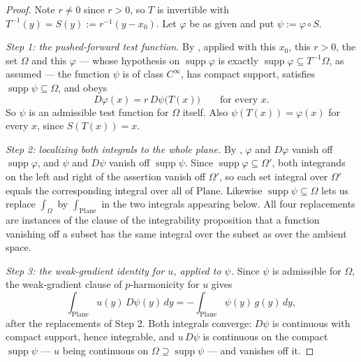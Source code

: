 \begin{proof}
Note $r\ne0$ since $r>0$, so $T$ is invertible with $T^{-1}(y)=S(y):=r^{-1}(y-x_0)$.  Let
$\varphi$ be as given and put $\psi:=\varphi\circ S$.

\medskip\noindent\emph{Step 1: the pushed-forward test function.}
By , applied with this $x_0$, this $r>0$, the set $\Omega$ and
this $\varphi$ --- whose hypothesis on $\operatorname{supp}\varphi$ is exactly
$\operatorname{supp}\varphi\subseteq T^{-1}\Omega$, as assumed --- the function $\psi$ is of class
$C^{\infty}$, has compact support, satisfies $\operatorname{supp}\psi\subseteq\Omega$, and obeys
\begin{equation}\label{eq:nwg-chain}
  D\varphi(x)=r\,D\psi\bigl(T(x)\bigr)\qquad\text{for every }x .
\end{equation}
So $\psi$ is an admissible test function for $\Omega$ itself.  Also $\psi(T(x))=\varphi(x)$ for
every $x$, since $S(T(x))=x$.

\medskip\noindent\emph{Step 2: localizing both integrals to the whole plane.}
By , $\varphi$ and $D\varphi$ vanish off
$\operatorname{supp}\varphi$, and $\psi$ and $D\psi$ vanish off $\operatorname{supp}\psi$.  Since
$\operatorname{supp}\varphi\subseteq\Omega'$, both integrands on the left and right of the
assertion vanish off $\Omega'$, so each set integral over $\Omega'$ equals the corresponding
integral over all of $\mathrm{Plane}$.  Likewise $\operatorname{supp}\psi\subseteq\Omega$ lets us
replace $\int_\Omega$ by $\int_{\mathrm{Plane}}$ in the two integrals appearing below.  All four
replacements are instances of the clause of the integrability proposition that a function
vanishing off a subset has the same integral over the subset as over the ambient space.

\medskip\noindent\emph{Step 3: the weak-gradient identity for $u$, applied to $\psi$.}
Since $\psi$ is admissible for $\Omega$, the weak-gradient clause of
$p$-harmonicity for $u$ gives
\begin{equation}\label{eq:nwg-key}
  \int_{\mathrm{Plane}}u(y)\,D\psi(y)\,dy=-\int_{\mathrm{Plane}}\psi(y)\,g(y)\,dy ,
\end{equation}
after the replacements of Step 2.  Both integrals converge: $D\psi$ is continuous with compact
support, hence integrable, and $u\,D\psi$ is continuous on the compact $\operatorname{supp}\psi$
--- $u$ being continuous on $\Omega\supseteq\operatorname{supp}\psi$ --- and vanishes off it.


\end{proof}
